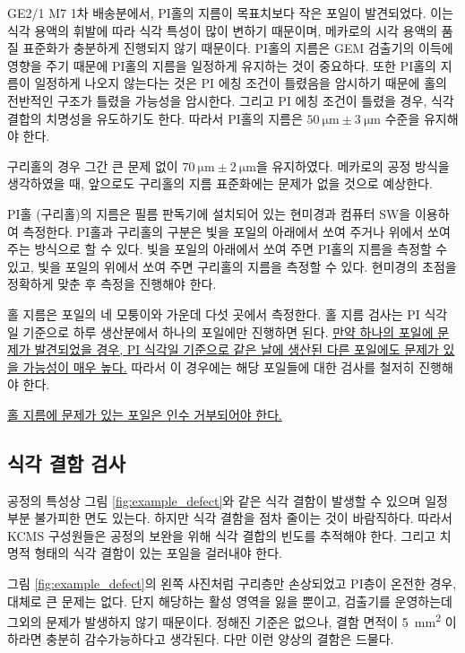 GE2/1 M7 1차 배송분에서, PI홀의 지름이 목표치보다 작은 포일이 발견되었다. 이는 식각 용액의 휘발에 따라 식각 특성이 많이 변하기 때문이며, 메카로의 시각 용액의 품질 표준화가 충분하게 진행되지 않기 때문이다. PI홀의 지름은 GEM 검출기의 이득에 영향을 주기 때문에 PI홀의 지름을 일정하게 유지하는 것이 중요하다. 또한 PI홀의 지름이 일정하게 나오지 않는다는 것은 PI 에칭 조건이 틀렸음을 암시하기 때문에 홀의 전반적인 구조가 틀렸을 가능성을 암시한다. 그리고 PI 에칭 조건이 틀렸을 경우, 식각 결합의 치명성을 유도하기도 한다. 따라서 PI홀의 지름은 $\SI{50}{\micro\meter}\pm\SI{3}{\micro\meter}$ 수준을 유지해야 한다.

구리홀의 경우 그간 큰 문제 없이 $\SI{70}{\micro\meter}\pm\SI{2}{\micro\meter}$을 유지하였다. 메카로의 공정 방식을 생각하였을 때, 앞으로도 구리홀의 지름 표준화에는 문제가 없을 것으로 예상한다.

PI홀 (구리홀)의 지름은 필름 판독기에 설치되어 있는 현미경과 컴퓨터 SW을 이용하여 측정한다. PI홀과 구리홀의 구분은 빛을 포일의 아래에서 쏘여 주거나 위에서 쏘여 주는 방식으로 할 수 있다. 빛을 포일의 아래에서 쏘여 주면 PI홀의 지름을 측정할 수 있고, 빛을 포일의 위에서 쏘여 주면 구리홀의 지름을 측정할 수 있다. 현미경의 초점을 정확하게 맞춘 후 측정을 진행해야 한다.

홀 지름은 포일의 네 모퉁이와 가운데 다섯 곳에서 측정한다. 홀 지름 검사는 PI 식각일 기준으로 하루 생산분에서 하나의 포일에만 진행하면 된다. \uline{만약 하나의 포일에 문제가 발견되었을 경우, PI 식각일 기준으로 같은 날에 생산된 다른 포일에도 문제가 있을 가능성이 매우 높다.} 따라서 이 경우에는 해당 포일들에 대한 검사를 철저히 진행해야 한다.
 
\uline{홀 지름에 문제가 있는 포일은 인수 거부되어야 한다.}

\subsection{식각 결함 검사}
공정의 특성상 그림 \ref{fig:example_defect}와 같은 식각 결함이 발생할 수 있으며 일정 부분 불가피한 면도 있는다. 하지만 식각 결함을 점차 줄이는 것이 바람직하다. 따라서 KCMS 구성원들은 공정의 보완을 위해 식각 결합의 빈도를 추적해야 한다. 그리고 치명적 형태의 식각 결함이 있는 포일을 걸러내야 한다. 

그림 \ref{fig:example_defect}의 왼쪽 사진처럼 구리층만 손상되었고 PI층이 온전한 경우, 대체로 큰 문제는 없다. 단지 해당하는 활성 영역을 잃을 뿐이고, 검출기를 운영하는데 그외의 문제가 발생하지 않기 때문이다. 정해진 기준은 없으나, 결함 면적이 \SI{5}{\milli\meter\squared} 이하라면 충분히 감수가능하다고 생각된다. 다만 이런 양상의 결함은 드물다.

